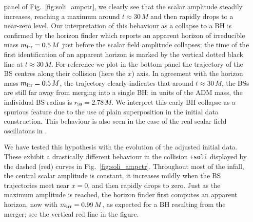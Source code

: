 \documentclass[11pt]{report}  %
\begin{document}
panel of Fig.~\ref{fig:soli_ampctr}, we clearly see
that the scalar amplitude steadily increases, reaching a maximum
around $t\approx 30\,M$ and then rapidly drops to a near-zero level.
Our interpretation of this behaviour as a collapse to a BH is confirmed
by the horizon finder which reports an apparent horizon of irreducible
mass $m_{\rm irr}=0.5\,M$ just before the scalar field amplitude
collapses; the time of the first identification of an apparent horizon
is marked by the vertical dotted black line at $t\approx 30\,M$.
For reference we plot in the bottom panel the trajectory of the BS centres
along their collision (here the $x$) axis. In agreement with the
horizon mass $m_{\rm irr}=0.5\,M$, the trajectory clearly indicates
that around $t\approx 30\,M$, the BSs are still far away from merging
into a single BH; in units of the ADM mass,
the individual BS radius is $r_{99}=2.78\,M$. We interpret
this early BH collapse as a spurious feature due to the use of
plain superposition in the initial data construction.
This behaviour is also seen in the case of the real scalar
field oscillatons in \cite{Helfer:2018vtq}.

We have tested this hypothesis with the evolution
of the adjusted initial data.
These exhibit a drastically different behaviour
in the collision {\tt +soli} displayed by the dashed (red) curves in
Fig.~\ref{fig:soli_ampctr}.
Throughout most of the infall, the central scalar amplitude
is constant, it increases mildly when the BS trajectories meet near $x=0$,
and then rapidly drops to zero. Just as the maximum amplitude is reached,
the horizon finder first computes an apparent horizon, now with 
$m_{\rm irr}=0.99\,M$, as expected for a BH resulting from the merger;
see the vertical red line in the figure.
\end{document}

